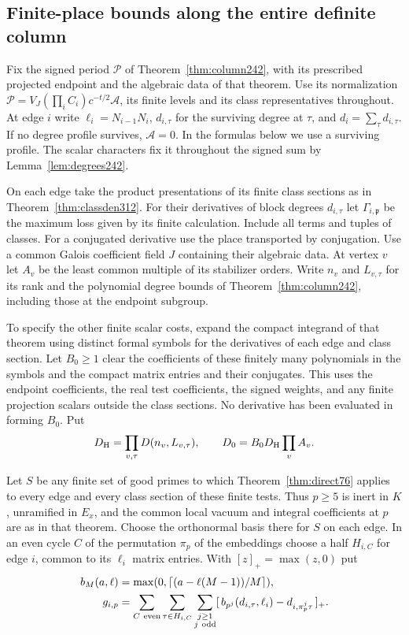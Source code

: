 \documentclass[a4paper,11pt]{article}
\theoremstyle{definition}
\theoremstyle{remark}
\numberwithin{equation}{section}
\begin{document}
\subsection{Finite-place bounds along the entire definite column}\label{nav:VI-62}
Fix the signed period \(\mathcal P\) of Theorem~\ref{thm:column242},
with its prescribed projected endpoint and the algebraic data of
that theorem. Use its normalization
\(\mathcal P=V_J(\prod_i C_i)c^{-t/2}\mathcal A\), its finite
levels and its class representatives throughout. At edge \(i\)
write \(\ell_i=N_{i-1}N_i\), \(d_{i,\tau}\) for the surviving
degree at \(\tau\), and \(d_i=\sum_\tau d_{i,\tau}\). If no degree
profile survives, \(\mathcal A=0\). In the formulas below we use a
surviving profile. The scalar characters fix it throughout the signed
sum by Lemma~\ref{lem:degrees242}.

On each edge take the product presentations of its finite class
sections as in Theorem~\ref{thm:classden312}. For their derivatives
of block degrees \(d_{i,\tau}\) let \(\Gamma_{i,\mathfrak p}\)
be the maximum loss given by its finite calculation. Include all
terms and tuples of classes. For a conjugated derivative use the
place transported by conjugation. Use a common Galois coefficient
field \(J\) containing their algebraic data. At vertex \(v\)
let \(A_v\) be the least common multiple of its stabilizer orders.
Write \(n_v\) and \(L_{v,\tau}\) for its rank and the polynomial
degree bounds of Theorem~\ref{thm:column242}, including those at
the endpoint subgroup.

To specify the other finite scalar costs, expand the compact
integrand of that theorem using distinct formal symbols for the
derivatives of each edge and class section. Let \(B_0\ge1\) clear
the coefficients of these finitely many polynomials in the
symbols and the compact matrix entries and their conjugates.
This uses the endpoint coefficients, the real test coefficients,
the signed weights, and any finite projection scalars outside the
class sections. No derivative has been evaluated in forming \(B_0\).
Put
\[
 D_{\rm H}=\prod_{v,\tau}D(n_v,L_{v,\tau}),\qquad
 D_0=B_0D_{\rm H}\prod_v A_v.
\]

Let \(S\) be any finite set of good primes to which
Theorem~\ref{thm:direct76} applies to every edge and every class
section of these finite tests. Thus \(p\ge5\) is inert in \(K\),
unramified in \(E_x\), and the common local vacuum and integral
coefficients at \(p\) are as in that theorem. Choose the
orthonormal basis there for \(S\) on each edge. In an even cycle
\(C\) of the permutation \(\pi_p\) of the embeddings choose a half
\(H_{i,C}\) for edge \(i\), common to its \(\ell_i\) matrix entries.
With \([z]_+=\max(z,0)\) put
\[
 \begin{split}
 b_M(a,\ell)&=\max(0,\lceil(a-\ell(M-1))/M\rceil),\\
 g_{i,p}&=\sum_{C\ {\rm even}}\sum_{\tau\in H_{i,C}}
          \sum_{\substack{j\ge1\\ j\ {\rm odd}}}
   [\,b_{p^j}(d_{i,\tau},\ell_i)-d_{i,\pi_p^j\tau}\,]_+ .
 \end{split}
\]
\end{document}
